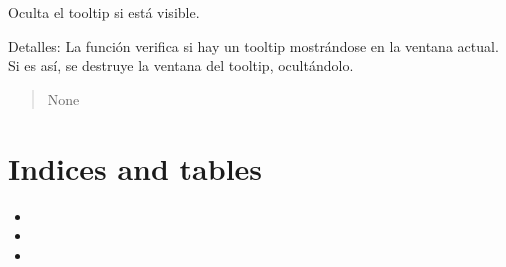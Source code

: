 \documentclass[letterpaper,10pt,spanish]{sphinxmanual}
\begin{document}
\begin{fulllineitems}

\begin{fulllineitems}
\label{\detokenize{tooltip:tooltip.Tooltip.ocultar_tooltip}}
\pysigstartsignatures
{}
\pysigstopsignatures
\sphinxAtStartPar
Oculta el tooltip si está visible.

\sphinxAtStartPar
Detalles:
La función verifica si hay un tooltip mostrándose en la ventana actual. Si es así,
se destruye la ventana del tooltip, ocultándolo.
\begin{quote}\begin{description}
\sphinxAtStartPar
None

\end{description}\end{quote}

\end{fulllineitems}


\end{fulllineitems}



\chapter{Indices and tables}
\label{\detokenize{index:indices-and-tables}}\begin{itemize}
\item {} 
\sphinxAtStartPar
{}

\item {} 
\sphinxAtStartPar
{}

\item {} 
\sphinxAtStartPar
{}

\end{itemize}
\end{document}
